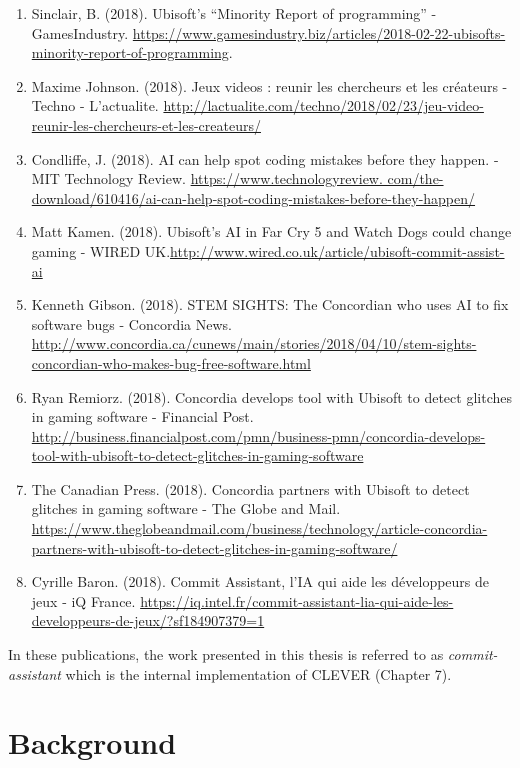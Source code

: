 \documentclass[12pt]{report}
\begin{document}
\begin{enumerate}
\def\labelenumi{\arabic{enumi}.}
\setcounter{enumi}{13}
\item
  Sinclair, B. (2018). Ubisoft's ``Minority Report of programming'' -
  GamesIndustry.
  \url{https://www.gamesindustry.biz/articles/2018-02-22-ubisofts-minority-report-of-programming}.
\item
  Maxime Johnson. (2018). Jeux videos : reunir les chercheurs et les
  créateurs - Techno - L'actualite.
  \url{http://lactualite.com/techno/2018/02/23/jeu-video-reunir-les-chercheurs-et-les-createurs/}
\item
  Condliffe, J. (2018). AI can help spot coding mistakes before they
  happen. - MIT Technology Review. \url{https://www.technologyreview.
  com/the-download/610416/ai-can-help-spot-coding-mistakes-before-they-happen/}
\item
  Matt Kamen. (2018). Ubisoft's AI in Far Cry 5 and Watch Dogs could
  change gaming - WIRED
  UK.\url{http://www.wired.co.uk/article/ubisoft-commit-assist-ai}
\item
  Kenneth Gibson. (2018). STEM SIGHTS: The Concordian who uses AI to fix
  software bugs - Concordia News.
  \url{http://www.concordia.ca/cunews/main/stories/2018/04/10/stem-sights-concordian-who-makes-bug-free-software.html}
\item
  Ryan Remiorz. (2018). Concordia develops tool with Ubisoft to detect
  glitches in gaming software - Financial Post.
  \url{http://business.financialpost.com/pmn/business-pmn/concordia-develops-tool-with-ubisoft-to-detect-glitches-in-gaming-software}
\item
  The Canadian Press. (2018). Concordia partners with Ubisoft to detect
  glitches in gaming software - The Globe and Mail.
  \url{https://www.theglobeandmail.com/business/technology/article-concordia-partners-with-ubisoft-to-detect-glitches-in-gaming-software/}
\item
  Cyrille Baron. (2018). Commit Assistant, l'IA qui aide les
  développeurs de jeux - iQ France.
  \url{https://iq.intel.fr/commit-assistant-lia-qui-aide-les-developpeurs-de-jeux/?sf184907379=1}
\end{enumerate}

In these publications, the work presented in this thesis is referred to
as \emph{commit-assistant} which is the internal implementation of
CLEVER (Chapter 7).

\chapter{Background}\label{background}
\end{document}
